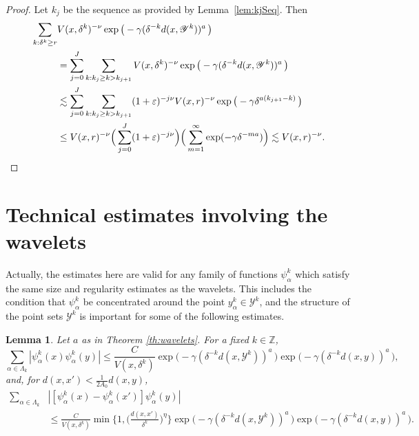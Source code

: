\documentclass{amsart}
\numberwithin{equation}{section}
\theoremstyle{plain}
\newtheorem{lemma}[equation]{Lemma}
\theoremstyle{definition}
\theoremstyle{remark}
\begin{document}
{{{\begin{proof}
Let $k_j$ be the sequence as provided by Lemma~\ref{lem:kjSeq}. Then
\begin{equation*}
\begin{split}
 \sum_{k:\delta^k\geq r} &V(x,\delta^k)^{-\nu}\exp\big(-\gamma(\delta ^{-k}{d(x,\mathscr{Y}^k)})^a\,  \big)\\
 &=\sum_{j=0}^J\sum_{k:k_j\geq k>k_{j+1}}
    V(x,\delta^k)^{-\nu}\exp\big(-\gamma(\delta ^{-k}{d(x,\mathscr{Y}^k)})^a\,  \big) \\
 &\lesssim\sum_{j=0}^J\sum_{k:k_j\geq k>k_{j+1}}(1+\varepsilon)^{-j\nu}V(x,r)^{-\nu} 
    \exp\big(-\gamma\delta^{a(k_{j+1}-k)}\, \big) \\
 &\leq V(x,r)^{-\nu} \Big(\sum_{j=0}^J (1+\varepsilon)^{-j\nu}\Big)
     \Big(\sum_{m=1}^{\infty} \exp(-\gamma\delta^{-ma})\Big) \lesssim V(x,r)^{-\nu}.\qedhere
\end{split}
\end{equation*}
\end{proof}
  
   
 
\section{Technical estimates involving the wavelets}\label{sec:techWavelets}\label{sec:technical}

Actually, the estimates here are valid for any family of functions $\psi^k_\alpha$ which satisfy the same size and regularity estimates as the wavelets. This includes the condition that $\psi^k_\alpha$ be concentrated around the point $y^k_\alpha\in\mathscr{Y}^k$, and the structure of the point sets $\mathscr{Y}^k$ is important for some of the following estimates.

\begin{lemma}\label{lem:sumAlpha} Let $a$ as in Theorem \ref{th:wavelets}.
For a fixed $k\in{\mathbb{Z}}$,
\begin{equation*}
  \sum_{\alpha\in\Lambda_k}{|{\psi^k_\alpha(x)\psi^k_\alpha(y)}|}
  \leq\frac{C}{V(x,\delta^k)}\exp\big(-\gamma (\delta ^{-k}{d(x,\mathscr{Y}^k)})^a \, \big)\exp\big(-\gamma (\delta ^{-k}{d(x,y)})^a \, \big),
\end{equation*}
and, for $d(x,x')<\frac{1}{2A_0}d(x,y)$,
\begin{equation*}
\begin{split}
    \sum_{\alpha\in\Lambda_k} &{|{[\psi^k_\alpha(x)-\psi^k_\alpha(x')]\psi^k_\alpha(y)}|} \\
  &\leq\frac{C}{V(x,\delta^k)}\min\Big\{1,\Big(\frac{d(x,x')}{\delta^k}\Big)^{\eta}\Big\}\exp\big(-\gamma (\delta ^{-k}{d(x,\mathscr{Y}^k)})^a \, \big)\exp\big(-\gamma (\delta ^{-k}{d(x,y)})^a \, \big).
\end{split}
\end{equation*}
\end{lemma}
 
}}}
\end{document}
